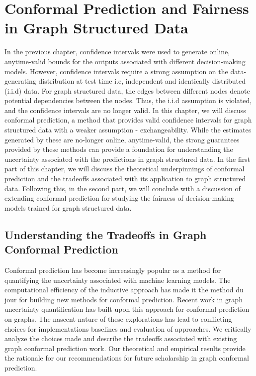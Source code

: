 \chapter{Conformal Prediction and Fairness in Graph Structured Data}
\label{chp:graphConformal}
In the previous chapter, confidence intervals were used to generate online, anytime-valid bounds for the outputs associated with different decision-making models.
However, confidence intervals require a strong assumption on the data-generating distribution at test time i.e, independent and identically distributed (i.i.d) data.
For graph structured data, the edges between different nodes denote potential dependencies between the nodes.
Thus, the i.i.d assumption is violated, and the confidence intervals are no longer valid.
In this chapter, we will discuss conformal prediction, a method that provides valid confidence intervals for graph structured data with a weaker assumption - exchangeability.
While the estimates generated by these are no-longer online, anytime-valid, the strong guarantees provided by these methods can provide a foundation for understanding the uncertainty associated with the predictions in graph structured data.
In the first part of this chapter, we will discuss the theoretical underpinnings of conformal prediction and the tradeoffs associated with its application to graph structured data.
Following this, in the second part, we will conclude with a discussion of extending conformal prediction for studying the fairness of decision-making models trained for graph structured data.

\section{Understanding the Tradeoffs in Graph Conformal Prediction}

Conformal prediction has become increasingly popular as a method for quantifying the uncertainty associated with machine learning models. 
The computational efficiency of the inductive approach has made it the method du jour for building new methods for conformal prediction.
Recent work in graph uncertainty quantification has built upon this approach for conformal prediction on graphs.
The nascent nature of these explorations has lead to conflicting choices for implementations baselines and evaluation of approaches.
We critically analyze the choices made and describe the tradeoffs associated with existing graph conformal prediction work. 
Our theoretical and empirical results provide the rationale for our recommendations for future scholarship in graph conformal prediction.

